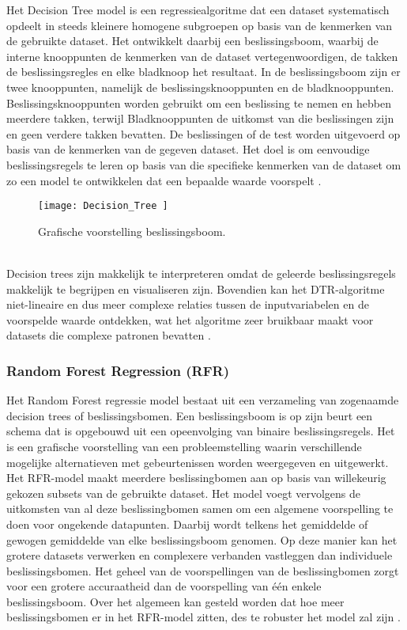 Het Decision Tree model is een regressiealgoritme dat een dataset systematisch opdeelt in steeds kleinere homogene subgroepen op basis van de kenmerken van de gebruikte dataset. Het ontwikkelt daarbij een beslissingsboom, waarbij de interne knooppunten de kenmerken van de dataset vertegenwoordigen, de takken de beslissingsregles en elke bladknoop het resultaat. In de beslissingsboom zijn er twee knooppunten, namelijk de beslissingsknooppunten en de bladknooppunten. Beslissingsknooppunten worden gebruikt om een beslissing te nemen en hebben meerdere takken, terwijl Bladknooppunten de uitkomst van die beslissingen zijn en geen verdere takken bevatten.
De beslissingen of de test worden uitgevoerd op basis van de kenmerken van de gegeven dataset. Het doel is om eenvoudige beslissingsregels te leren op basis van die specifieke kenmerken van de dataset om zo een model te ontwikkelen dat een bepaalde waarde voorspelt  \autocite{Balakumar2023}.  
\\
\begin{figure}[h!]
    \centering\texttt{[image: Decision\_Tree ]}
    \caption{\label{fig:Decision_Tree}Grafische voorstelling beslissingsboom.}
\end{figure} 
\\

Decision trees zijn makkelijk te interpreteren omdat de geleerde beslissingsregels makkelijk te begrijpen en visualiseren zijn. Bovendien kan het DTR-algoritme niet-lineaire en dus meer complexe relaties tussen de inputvariabelen en de voorspelde waarde ontdekken, wat het algoritme zeer bruikbaar maakt voor datasets die complexe patronen bevatten  \autocite{Viswa2023}. 

\subsubsection{Random Forest Regression (RFR)}

Het Random Forest regressie model bestaat uit een verzameling van zogenaamde decision trees of beslissingsbomen. Een beslissingsboom is op zijn beurt een schema dat is opgebouwd uit een opeenvolging van binaire beslissingsregels. Het is een grafische voorstelling van een probleemstelling waarin verschillende mogelijke alternatieven met gebeurtenissen worden weergegeven en uitgewerkt. Het RFR-model maakt meerdere beslissingbomen aan op basis van willekeurig gekozen subsets van de gebruikte dataset. Het model voegt vervolgens de uitkomsten van al deze beslissingbomen samen om een algemene voorspelling te doen voor ongekende datapunten. Daarbij wordt telkens het gemiddelde of gewogen gemiddelde van elke beslissingsboom genomen. Op deze manier kan het grotere datasets verwerken en complexere verbanden vastleggen dan individuele beslissingsbomen. Het geheel van de voorspellingen van de beslissingbomen zorgt voor een grotere accuraatheid dan de voorspelling van één enkele beslissingsboom. Over het algemeen kan gesteld worden dat hoe meer beslissingsbomen er in het RFR-model zitten, des te robuster het model zal zijn \autocite{Balakumar2023}. \\

